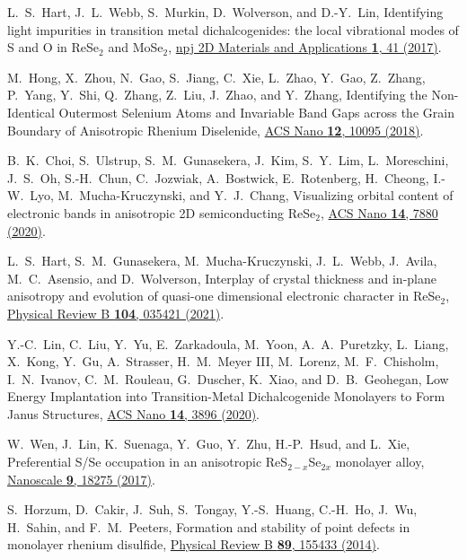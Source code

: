 \documentclass[reprint, superscriptaddress, amsmath,amssymb,prb,twocolumn]{revtex4-2}
\begin{document}
\begin{thebibliography}{116}

 L.~S.~Hart, J.~L.~Webb, S.~Murkin, D.~Wolverson, and D.-Y.~Lin, Identifying light impurities in transition metal dichalcogenides: the local vibrational modes of S and O in ReSe$_{2}$ and MoSe$_{2}$, \href{https://dx.doi.org/10.1038/s41699-017-0043-1}{npj 2D Materials and Applications {\bf 1}, 41 (2017)}.

 M.~Hong, X.~Zhou, N.~Gao, S.~Jiang, C.~Xie, L.~Zhao, Y.~Gao, Z.~Zhang, P.~Yang, Y.~Shi, Q.~Zhang, Z.~Liu, J.~Zhao, and Y.~Zhang, Identifying the Non-Identical Outermost Selenium Atoms and Invariable Band Gaps across the Grain Boundary of Anisotropic Rhenium Diselenide, \href{https://dx.doi.org/10.1021/acsnano.8b04872}{ACS Nano {\bf 12}, 10095 (2018)}.

 B.~K.~Choi, S.~Ulstrup, S.~M.~Gunasekera, J.~Kim, S.~Y.~Lim, L.~Moreschini, J.~S.~Oh, S.-H.~Chun, C.~Jozwiak, A.~Bostwick, E.~Rotenberg, H.~Cheong, I.-W.~Lyo, M.~Mucha-Kruczynski, and Y.~J.~Chang, Visualizing orbital content of electronic bands in anisotropic 2D semiconducting ReSe$_{2}$, \href{https://dx.doi.org/10.1021/acsnano.0c01054}{ACS Nano {\bf 14}, 7880 (2020)}.

 L.~S.~Hart, S.~M.~Gunasekera, M.~Mucha-Kruczynski, J.~L.~Webb, J.~Avila, M.~C.~Asensio, and D.~Wolverson, Interplay of crystal thickness and in-plane anisotropy and evolution of quasi-one dimensional electronic character in ReSe$_{2}$, \href{https://dx.doi.org/10.1103/PhysRevB.104.035421}{Physical Review B {\bf 104}, 035421 (2021)}.

 Y.-C.~Lin, C.~Liu, Y.~Yu, E.~Zarkadoula, M.~Yoon, A.~A.~Puretzky, L.~Liang, X.~Kong, Y.~Gu, A.~Strasser, H.~M.~Meyer III, M.~Lorenz, M.~F.~Chisholm, I.~N.~Ivanov, C.~M.~Rouleau, G.~Duscher, K.~Xiao, and D.~B.~Geohegan, Low Energy Implantation into Transition-Metal Dichalcogenide Monolayers to Form Janus Structures, \href{https://dx.doi.org/10.1021/acsnano.9b10196}{ACS Nano {\bf 14}, 3896 (2020)}. %

 W.~Wen, J.~Lin, K.~Suenaga, Y.~Guo, Y.~Zhu, H.-P.~Hsud, and L.~Xie, Preferential S/Se occupation in an anisotropic ReS$_{2-x}$Se$_{2x}$ monolayer alloy, \href{https://dx.doi.org/10.1039/c7nr05289h}{Nanoscale {\bf 9}, 18275 (2017)}.

 S.~Horzum, D.~Cakir, J.~Suh, S.~Tongay, Y.-S.~Huang, C.-H.~Ho, J.~Wu, H.~Sahin, and F.~M.~Peeters, Formation and stability of point defects in monolayer rhenium disulfide, \href{https://dx.doi.org/10.1103/PhysRevB.89.155433}{Physical Review B {\bf 89}, 155433 (2014)}. %


\end{thebibliography}
\end{document}
